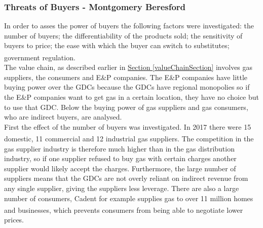 \documentclass[11pt]{article}		%
\newcommand{\supercite}[1]{\textsuperscript{\cite{#1}}}		%
\newcommand{\sectref}[1]{\hyperref[#1]{Section \ref*{#1}}}     %
\begin{document}
		
		\subsubsection[Power of Buyers]{Threats of Buyers - Montgomery Beresford}
		
		        In order to asses the power of buyers the following factors were investigated: the number of buyers; the differentiability of the products sold; the sensitivity of buyers to price; the ease with which the buyer can switch to substitutes; government regulation\supercite{Barney}.
		        \\ 
		        \hspace*{2ex}The value chain, as described earlier in \sectref{valueChainSection} involves gas suppliers, the consumers and E\&P companies. The E\&P companies have little buying power over the GDCs because the GDCs have regional monopolies so if the E\&P companies want to get gas in a certain location, they have no choice but to use that GDC. Below the buying power of gas suppliers and gas consumers, who are indirect buyers, are analysed. %
                \\
                \hspace*{2ex}
                First the effect of the number of buyers was investigated. In 2017 there were 15 domestic, 11 commercial and 12 industrial gas suppliers\supercite{competition_in_gas_supply}. The competition in the gas supplier industry is therefore much higher than in the gas distribution industry, so if one supplier refused to buy gas with certain charges another supplier would likely accept the charges. Furthermore, the large number of suppliers means that the GDCs are not overly reliant on indirect revenue from any single supplier, giving the suppliers less leverage. There are also a large number of consumers, Cadent for example supplies gas to over 11 million homes and businesses\supercite{Cadent_Plan}, which prevents consumers from being able to negotiate lower prices.
\end{document}
